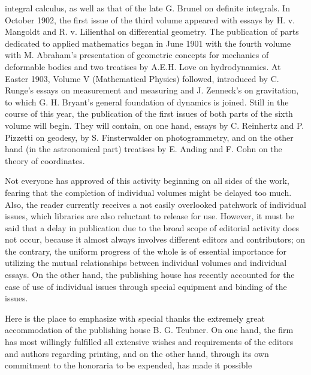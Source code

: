 \thispagestyle{fancy}

\vspace{0.5cm}

integral calculus, as well as that of the late G. Brunel on definite integrals. In October 1902, the first issue of the third volume appeared with essays by H. v. Mangoldt and R. v. Lilienthal on differential geometry. The publication of parts dedicated to applied mathematics began in June 1901 with the fourth volume with M. Abraham's presentation of geometric concepts for mechanics of deformable bodies and two treatises by A.E.H. Love on hydrodynamics. At Easter 1903, Volume V (Mathematical Physics) followed, introduced by C. Runge's essays on measurement and measuring and J. Zenneck's on gravitation, to which G. H. Bryant's general foundation of dynamics is joined. Still in the course of this year, the publication of the first issues of both parts of the sixth volume will begin. They will contain, on one hand, essays by C. Reinhertz and P. Pizzetti on geodesy, by S. Finsterwalder on photogrammetry, and on the other hand (in the astronomical part) treatises by E. Anding and F. Cohn on the theory of coordinates.

Not everyone has approved of this activity beginning on all sides of the work, fearing that the completion of individual volumes might be delayed too much. Also, the reader currently receives a not easily overlooked patchwork of individual issues, which libraries are also reluctant to release for use. However, it must be said that a delay in publication due to the broad scope of editorial activity does not occur, because it almost always involves different editors and contributors; on the contrary, the uniform progress of the whole is of essential importance for utilizing the mutual relationships between individual volumes and individual essays. On the other hand, the publishing house has recently accounted for the ease of use of individual issues through special equipment and binding of the issues.

Here is the place to emphasize with special thanks the extremely great accommodation of the publishing house B. G. Teubner. On one hand, the firm has most willingly fulfilled all extensive wishes and requirements of the editors and authors regarding printing, and on the other hand, through its own commitment to the honoraria to be expended, has made it possible

